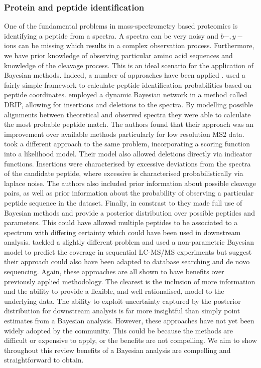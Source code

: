 \documentclass[12pt,english, journal=jpr, layout=twocolumn]{article}
\begin{document}
\subsubsection{Protein and peptide identification}
One of the fundamental problems in mass-spectrometry based proteomics is identifying a peptide from a spectra. A spectra can be very noisy and $b-,y-$ ions can be missing which results in a complex observation process. Furthermore, we have prior knowledge of observing particular amino acid sequences and knowledge of the cleavage process. This is an ideal scenario for the application of Bayesian methods. Indeed, a number of approaches have been applied \citep{Chen::2005, Halloran::2016, Lewis::2018, Claassen::2009}. \citet{Chen::2005} used a fairly simple framework to calculate peptide identification probabilities based on peptide coordinates. \citet{Halloran::2016} employed a dynamic Bayesian network in a method called DRIP, allowing for insertions and deletions to the spectra. By modelling possible alignments between theoretical and observed spectra they were able to calculate the most probable peptide match. The authors found that their approach was an improvement over available methods particularly for low resolution MS2 data. \citet{Lewis::2018} took a different approach to the same problem, incorporating a scoring function into a likelihood model. Their model also allowed deletions directly via indicator functions. Insertions were characterised by excessive deviations from the spectra of the candidate peptide, where excessive is characterised probabilistically via laplace noise. The authors also included prior information about possible cleavage pairs, as well as prior information about the probability of observing a particular peptide sequence in the dataset. Finally, in constrast to \citet{Halloran::2016} they made full use of Bayesian methods and provide a posterior distribution over possible peptides and parameters. This could have allowed multiple peptides to be associated to a spectrum with differing certainty which could have been used in downstream analysis. \citet{Claassen::2009} tackled a slightly different problem and used a non-parametric Bayesian model to predict the coverage in sequential LC-MS/MS experiments but suggest their approach could also have been adapted to database searching and de novo sequencing. Again, these approaches are all shown to have benefits over previously applied methodology. The clearest is the inclusion of more information and the ability to provide a flexible, and well rationalised, model to the underlying data. The ability to exploit uncertainty captured by the posterior distribution for downstream analysis is far more insightful than simply point estimates from a Bayesian analysis. However, these approaches have not yet been widely adopted by the community. This could be because the methods are difficult or expensive to apply, or the benefits are not compelling. We aim to show throughout this review benefits of a Bayesian analysis are compelling and straightforward to obtain.
\end{document}
